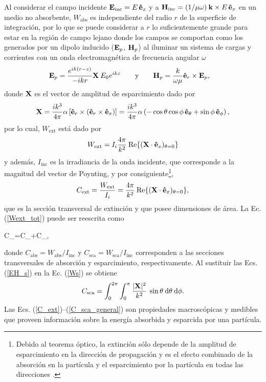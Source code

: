 Al considerar el campo incidente $\vb{E}_{\text{inc}}=E\,\vu{e}_x$ y a $\vb{H}_{\text{inc}}=(1/\mu \omega)\: \vb{k} \times E\, \vu{e}_x$ en un medio no absorbente, $W_{\text{abs}}$ es independiente del radio $r$ de la superficie de integración, por lo que se puede considerar a $r$ lo suficientemente grande para estar en la región de campo lejano donde los campos se comportan como los generados por un dipolo inducido ($\vb{E}_p$, $\vb{H}_p$) al iluminar un sistema de cargas y corrientes con un onda electromagnética de frecuencia angular $\omega$ \cite{bohrenAbsorptionScatteringLight2008}
%
\begin{align}
	\vb{E}_{p}&=\frac{e^{ik(r-z)}}{-ikr}\vb{X}\:E_0 e^{ikz}\qquad\text{y}\qquad
	\vb{H}_{p}=\frac{k}{\omega\mu}\vu{e}_r\times\vb{E}_{p},
	\label{EH_s}
\end{align}
%
donde $\vb{X}$ es el vector de amplitud de esparcimiento dado por
\begin{equation}
	\vb{X}=\frac{ik^3}{4\pi}\alpha \left[ \vu{e}_r\times(\vu{e}_r\times \vu{e}_x)\right]=\frac{ik^3}{4\pi}\alpha \left(-\cos\theta\cos\phi\, \vu{e}_{\theta}+\sin\phi\, \vu{e}_{\phi} \right),
	\label{eq:Xvec}
\end{equation}
%
por lo cual, $W_{\text{ext}}$ está dado por \cite{bohrenAbsorptionScatteringLight2008}
%
\begin{equation*}
	W_{\text{ext}}=I_i\frac{4\pi}{k^2}\:\text{Re}\{(\vb{X}\cdot\vu{e}_x)_{\theta=0}\}
\end{equation*}
%
y además, $I_{\text{inc}}$ es la irradiancia de la onda incidente, que corresponde a la magnitud del vector de Poynting, y por consiguiente\footnote{Debido al teorema óptico, la extinción sólo depende de la amplitud de esparcimiento en la dirección de propagación y es el efecto combinado de la absorción en la partícula y el esparcimiento por la partícula en todas las direcciones \cite{bohrenAbsorptionScatteringLight2008}.},
%
\begin{equation}
	C_{\text{ext}}=\frac{W_{\text{ext}}}{I_i}=\frac{4\pi}{k^2}\:\text{Re}\{(\vb{X}\cdot\vu{e}_x)_{\theta=0}\}, \label{C_ext}
\end{equation}
%
que es la sección transversal de extinción y que posee dimensiones de área. La Ec. (\ref{Wext_tot}) puede ser reescrita como \cite{bohrenAbsorptionScatteringLight2008}
%
\begin{tcolorbox}
	C_{}=C_{}+C_{},
	\label{C} 
\end{tcolorbox}
%
\noindent donde $C_{\text{abs}}=W_{\text{abs}}/I_{\text{inc}}$ y $C_{\text{sca}}=W_{\text{sca}}/I_{\text{inc}}$ corresponden a las secciones transversales de absorción y esparcimiento, respectivamente. Al sustituir las Ecs. (\ref{EH_s}) en la Ec. (\ref{Ws}) se obtiene
%
\begin{equation}
	C_{\text{sca}}=\int_0^{2\pi}\int_0^{\pi}\frac{|\vb{X}|^2}{k^2}\:\sin\theta\: \text{d}\theta\:\text{d}\phi.
	\label{C_sca_general}
\end{equation}
Las Ecs. (\ref{C_ext})--(\ref{C_sca_general}) son propiedades macroscópicas y medibles que proveen información sobre la energía absorbida y esparcida por una partícula.  \\

